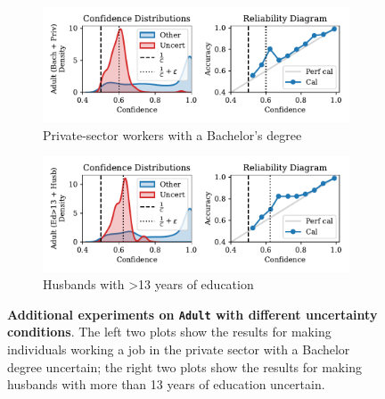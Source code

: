 \begin{figure}[t]
\centering

\begin{subfigure}[b]{0.495\textwidth}
  \centering
  \includegraphics[width=\linewidth]{figs/confidential_guardian/adult_res_bach_priv.pdf}
  \caption{Private-sector workers with a Bachelor's degree}
\end{subfigure}
\hfill
\begin{subfigure}[b]{0.495\textwidth}
  \centering
  \includegraphics[width=\linewidth]{figs/confidential_guardian/adult_res_ed13_husb.pdf}
  \caption{Husbands with >13 years of education}
\end{subfigure}

\caption[\textbf{Additional experiments on \texttt{Adult} with different uncertainty conditions.}]{\textbf{Additional experiments on \texttt{Adult} with different uncertainty conditions}. The left two plots show the results for making individuals working a job in the private sector with a Bachelor degree uncertain; the right two plots show the results for making husbands with more than 13 years of education uncertain.}
\label{fig:adult_ext}
\end{figure}


